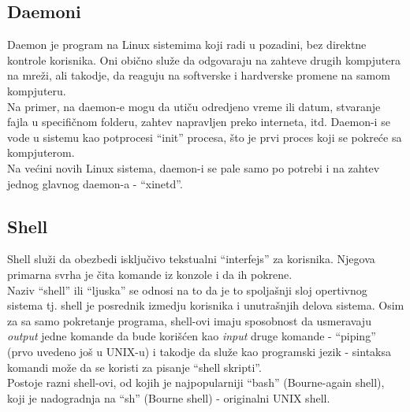 \subsection{Daemoni}
Daemon je program na Linux sistemima koji radi u pozadini, bez direktne kontrole korisnika. Oni obično služe da odgovaraju na zahteve drugih kompjutera na mreži, ali takodje, da reaguju na softverske i hardverske promene na samom kompjuteru.\\
Na primer, na daemon-e mogu da utiču odredjeno vreme ili datum, stvaranje fajla u specifičnom folderu, zahtev napravljen preko interneta, itd.
Daemon-i se vode u sistemu kao potprocesi ``init'' procesa, što je prvi proces koji se pokreće sa kompjuterom.\\
Na većini novih Linux sistema, daemon-i se pale samo po potrebi i na zahtev jednog glavnog daemon-a - ``xinetd''.

\subsection{Shell}
Shell služi da obezbedi isključivo tekstualni ``interfejs'' za korisnika. Njegova primarna svrha je čita komande iz konzole i da ih pokrene.\\
Naziv ``shell'' ili ``ljuska'' se odnosi na to da je to spoljašnji sloj opertivnog sistema tj. shell je posrednik izmedju korisnika i unutrašnjih delova sistema. Osim za sa samo pokretanje programa, shell-ovi imaju sposobnost da usmeravaju \textit{output} jedne komande da bude korišćen kao \textit{input} druge komande - ``piping'' (prvo uvedeno još u UNIX-u) i takodje da služe kao programski jezik - sintaksa komandi može da se koristi za pisanje ``shell skripti''.\\
Postoje razni shell-ovi, od kojih je najpopularniji ``bash'' (Bourne-again shell),  koji je nadogradnja na ``sh'' (Bourne shell) - originalni UNIX shell.
